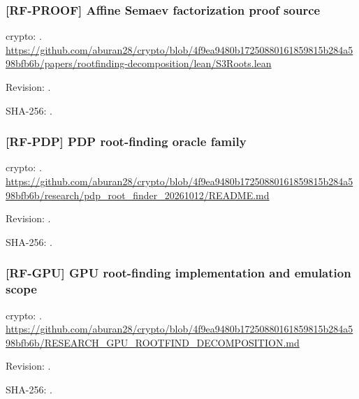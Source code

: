 \par\noindent\begin{minipage}{\linewidth}\small
\subsubsection*{[RF-PROOF] Affine Semaev factorization proof source}\label{art:RF-PROOF}
crypto: .
\url{https://github.com/aburan28/crypto/blob/4f9ea9480b17250880161859815b284a598bfb6b/papers/rootfinding-decomposition/lean/S3Roots.lean}
\par Revision: .
\par SHA-256: .
\end{minipage}\par\medskip

\par\noindent\begin{minipage}{\linewidth}\small
\subsubsection*{[RF-PDP] PDP root-finding oracle family}\label{art:RF-PDP}
crypto: .
\url{https://github.com/aburan28/crypto/blob/4f9ea9480b17250880161859815b284a598bfb6b/research/pdp_root_finder_20261012/README.md}
\par Revision: .
\par SHA-256: .
\end{minipage}\par\medskip

\par\noindent\begin{minipage}{\linewidth}\small
\subsubsection*{[RF-GPU] GPU root-finding implementation and emulation scope}\label{art:RF-GPU}
crypto: .
\url{https://github.com/aburan28/crypto/blob/4f9ea9480b17250880161859815b284a598bfb6b/RESEARCH_GPU_ROOTFIND_DECOMPOSITION.md}
\par Revision: .
\par SHA-256: .
\end{minipage}\par\medskip

